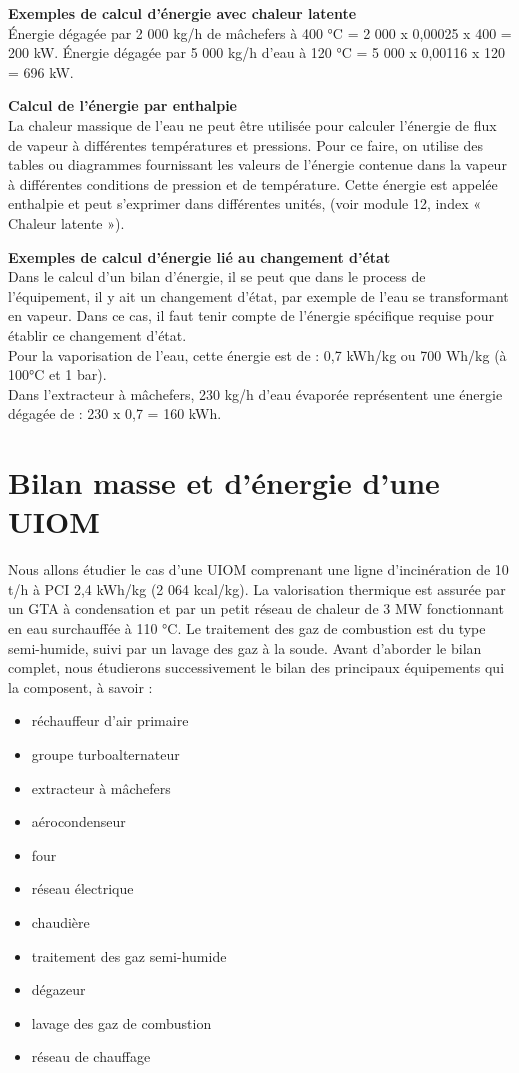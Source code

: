 \textbf{Exemples de calcul d’énergie avec chaleur latente}\\
Énergie dégagée par 2 000 kg/h de mâchefers à 400 °C = 2 000 x 0,00025 x 400 = 200 kW.
Énergie dégagée par 5 000 kg/h d’eau à 120 °C = 5 000 x 0,00116 x 120 = 696 kW.


\textbf{Calcul de l’énergie par enthalpie}\\
La chaleur massique de l’eau ne peut être utilisée pour calculer l’énergie de flux de vapeur à différentes températures et pressions. Pour ce faire, on utilise des tables ou diagrammes fournissant les valeurs de l’énergie contenue dans la vapeur à différentes conditions de pression et de température. Cette énergie est appelée enthalpie et peut s’exprimer dans différentes unités, (voir module 12, index « Chaleur latente »).

\textbf{Exemples de calcul d’énergie lié au changement d’état}\\
Dans le calcul d’un bilan d’énergie, il se peut que dans le process de l’équipement, il y ait un changement d'état, par exemple de l’eau se transformant en vapeur. Dans ce cas, il faut tenir compte de l’énergie spécifique requise pour établir ce changement d’état.
\\
Pour la vaporisation de l’eau, cette énergie est de : 0,7 kWh/kg ou 700 Wh/kg (à 100°C et 1 bar).
\\
Dans l’extracteur à mâchefers, 230 kg/h d’eau évaporée représentent une énergie dégagée de : 230 x 0,7 = 160 kWh.

\section{Bilan masse et d’énergie d’une UIOM}


Nous allons étudier le cas d’une UIOM comprenant une ligne d’incinération de 10 t/h à PCI 2,4 kWh/kg (2 064 kcal/kg).
La valorisation thermique est assurée par un GTA à condensation et par un petit réseau de chaleur de 3 MW fonctionnant en eau surchauffée à 110 °C. Le traitement des gaz de combustion est du type semi-humide, suivi par un lavage des gaz à la soude.
Avant d’aborder le bilan complet, nous étudierons successivement le bilan des principaux équipements qui la composent, à savoir :

 \begin{itemize}
     \item réchauffeur d’air primaire
     \item groupe turboalternateur
     \item extracteur à mâchefers
     \item aérocondenseur
     \item four
     \item réseau électrique
     \item chaudière
     \item traitement des gaz semi-humide
     \item dégazeur
     \item lavage des gaz de combustion
     \item réseau de chauffage
 \end{itemize}

